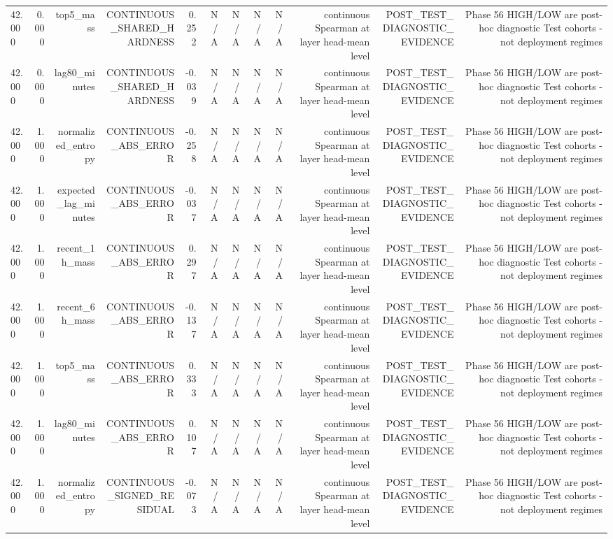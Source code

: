 \begin{table}[h!]
\begin{tabular}{lrrrrrrrrrrr}
42.000 & 0.000 & top5\_mass & CONTINUOUS\_SHARED\_HARDNESS & 0.252 & N/A & N/A & N/A & N/A & continuous Spearman at layer head-mean level & POST\_TEST\_DIAGNOSTIC\_EVIDENCE & Phase 56 HIGH/LOW are post-hoc diagnostic Test cohorts - not deployment regimes \\
42.000 & 0.000 & lag80\_minutes & CONTINUOUS\_SHARED\_HARDNESS & -0.039 & N/A & N/A & N/A & N/A & continuous Spearman at layer head-mean level & POST\_TEST\_DIAGNOSTIC\_EVIDENCE & Phase 56 HIGH/LOW are post-hoc diagnostic Test cohorts - not deployment regimes \\
42.000 & 1.000 & normalized\_entropy & CONTINUOUS\_ABS\_ERROR & -0.258 & N/A & N/A & N/A & N/A & continuous Spearman at layer head-mean level & POST\_TEST\_DIAGNOSTIC\_EVIDENCE & Phase 56 HIGH/LOW are post-hoc diagnostic Test cohorts - not deployment regimes \\
42.000 & 1.000 & expected\_lag\_minutes & CONTINUOUS\_ABS\_ERROR & -0.037 & N/A & N/A & N/A & N/A & continuous Spearman at layer head-mean level & POST\_TEST\_DIAGNOSTIC\_EVIDENCE & Phase 56 HIGH/LOW are post-hoc diagnostic Test cohorts - not deployment regimes \\
42.000 & 1.000 & recent\_1h\_mass & CONTINUOUS\_ABS\_ERROR & 0.297 & N/A & N/A & N/A & N/A & continuous Spearman at layer head-mean level & POST\_TEST\_DIAGNOSTIC\_EVIDENCE & Phase 56 HIGH/LOW are post-hoc diagnostic Test cohorts - not deployment regimes \\
42.000 & 1.000 & recent\_6h\_mass & CONTINUOUS\_ABS\_ERROR & -0.137 & N/A & N/A & N/A & N/A & continuous Spearman at layer head-mean level & POST\_TEST\_DIAGNOSTIC\_EVIDENCE & Phase 56 HIGH/LOW are post-hoc diagnostic Test cohorts - not deployment regimes \\
42.000 & 1.000 & top5\_mass & CONTINUOUS\_ABS\_ERROR & 0.333 & N/A & N/A & N/A & N/A & continuous Spearman at layer head-mean level & POST\_TEST\_DIAGNOSTIC\_EVIDENCE & Phase 56 HIGH/LOW are post-hoc diagnostic Test cohorts - not deployment regimes \\
42.000 & 1.000 & lag80\_minutes & CONTINUOUS\_ABS\_ERROR & 0.107 & N/A & N/A & N/A & N/A & continuous Spearman at layer head-mean level & POST\_TEST\_DIAGNOSTIC\_EVIDENCE & Phase 56 HIGH/LOW are post-hoc diagnostic Test cohorts - not deployment regimes \\
42.000 & 1.000 & normalized\_entropy & CONTINUOUS\_SIGNED\_RESIDUAL & -0.073 & N/A & N/A & N/A & N/A & continuous Spearman at layer head-mean level & POST\_TEST\_DIAGNOSTIC\_EVIDENCE & Phase 56 HIGH/LOW are post-hoc diagnostic Test cohorts - not deployment regimes \\

\end{tabular}
\end{table}
